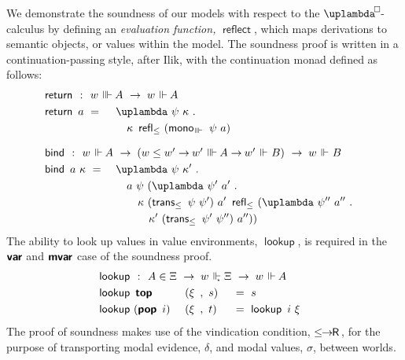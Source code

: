 \documentclass[submission,copyright,creativecommons,sharealike,backref=page]{eptcs}
\newcommand{\uplambdabox}{\uplambda^{\mkern-3mu\Box\mkern-3mu}}
\newcommand{\sA}{\mkern-2muA}
\newcommand{\R}{\mathrel{\rlap{$\mkern.75mu\textsf{R}$}\hphantom{\subseteq}}}
\renewcommand{\:}{\mathop{\mkern3mu:\mkern3mu}}
\renewcommand{\.}{\mathop{\mkern3mu.\mkern3mu}}
\renewcommand{\;}{\mathop{;}}
\renewcommand{\,}{\mathop{,}}
\newcommand{\ee}{\mathrel{\mkern2mu\Vdash\mkern1mu}}
\newcommand{\ees}{\mathrel{\mkern2mu\Vdash_{\mkern-9mu\scriptscriptstyle{\star}}}}
\newcommand{\eee}{\mathrel{\mkern2mu\Vvdash\mkern1mu}}
\renewcommand{\r}{\mathrel{\rightarrow\mkern-1mu}}
\newcommand{\reflect}{\operatorname{\textsf{reflect}}}
\newcommand{\monoeee}{\operatorname{\textsf{mono}_{\eee}}}
\newcommand{\reflle}{\operatorname{\textsf{refl}_{\le}}}
\newcommand{\transle}{\operatorname{\textsf{trans}_{\le}}}
\newcommand{\lerR}{\operatorname{\le\mkern-1mu\r\mkern-1mu\R}}
\newcommand{\var}{\operatorname{\textsf{\textbf{var}}}}
\newcommand{\mvar}{\operatorname{\textsf{\textbf{mvar}}}}
\newcommand{\tops}{\operatorname{\textsf{\textbf{top}}}}
\newcommand{\pops}{\operatorname{\textsf{\textbf{pop}}}}
\newcommand{\return}{\operatorname{\textsf{return}}}
\newcommand{\bind}{\operatorname{\textsf{bind}}}
\newcommand{\lookup}{\operatorname{\textsf{lookup}}}
\theoremstyle{mystyle}
\begin{document}
We demonstrate the soundness of our models with respect to the $\uplambdabox$-calculus by defining an \emph{evaluation function,} $\reflect$, which maps derivations to semantic objects, or values within the model.  The soundness proof is written in a continuation-passing style, after Ilik, with the continuation monad defined as follows:
\begin{alignat*}{3}
  & \return ~\:~ \rlap{$w \eee \sA ~\r~ w \ee \sA$}\\
  & \return~a      ~=~ && \uplambda~\psi~\kappa \.\\
  &                    && \quad \kappa~\reflle~(\monoeee~\psi~a)\\[.5\baselineskip]
  & \bind ~\:~ \rlap{$w \ee \sA ~\r~ (w \le w' \r w' \eee \sA \r w' \ee B) ~\r~ w \ee B$}\\
  & \bind~a~\kappa ~=~ && \uplambda~\psi~\kappa' \.\\
  &                    && \quad a~\psi~(\uplambda~\psi'~a' \.\\
  &                    && \quad\quad \kappa~(\transle~\psi~\psi')~a'~\reflle~(\uplambda~\psi''~a'' \.\\
  &                    && \quad\quad\quad \kappa'~(\transle~\psi'~\psi'')~a''))
\end{alignat*}
The ability to look up values in value environments, $\lookup$, is required in the $\var$ and $\mvar$ case of the soundness proof.
\begin{alignat*}{3}
  & \lookup ~\:~ \rlap{$A \in \Xi ~\r~ w \ees \Xi ~\r~ w \ee \sA$}\\
  & \lookup~\tops     && ~(\xi~\,~s) && ~=~ s\\
  & \lookup~(\pops~i) && ~(\xi~\,~t) && ~=~ \lookup~i~\xi
\end{alignat*}
The proof of soundness makes use of the vindication condition, $\lerR$, for the purpose of transporting modal evidence, $\delta$, and modal values, $\sigma$, between worlds.
\end{document}

